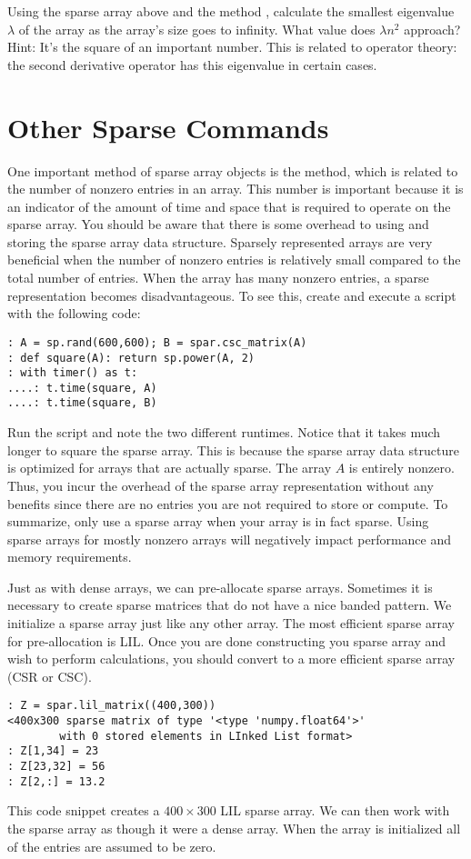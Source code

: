\begin{problem}
Using the sparse array above and the method , calculate the smallest eigenvalue $\lambda$ of the array as the array's size goes to infinity. What value does $\lambda n^2$ approach?  Hint: It's the square of an important number. This is related to operator theory: the second derivative operator has this eigenvalue in certain cases.
\end{problem}

\section*{Other Sparse Commands}

One important method of sparse array objects is the  method, which is related to the number of nonzero entries in an array.  This number is important because it is an indicator of the amount of time and space that is required to operate on the sparse array. You should be aware that there is some overhead to using and storing the sparse array data structure. Sparsely represented arrays are very beneficial when the number of nonzero entries is relatively small compared to the total number of entries. When the array has many nonzero entries, a sparse representation becomes disadvantageous. To see this, create and execute a script with the following code:
\begin{lstlisting}[style=python]
: A = sp.rand(600,600); B = spar.csc_matrix(A)
: def square(A): return sp.power(A, 2)
: with timer() as t:
....: t.time(square, A)
....: t.time(square, B)
\end{lstlisting}

Run the script and note the two different runtimes. Notice that it takes much longer to square the sparse array. This is because the sparse array data structure is optimized for arrays that are actually sparse. The array $A$ is entirely nonzero. Thus, you incur the overhead of the sparse array representation without any benefits since there are no entries you are not required to store or compute. To summarize, only use a sparse array when your array is in fact sparse. Using sparse arrays for mostly nonzero arrays will negatively impact performance and memory requirements.


Just as with dense arrays, we can pre-allocate sparse arrays. Sometimes it is necessary to create sparse matrices that do not have a nice banded pattern.  We initialize a sparse array just like any other array.  The most efficient sparse array for pre-allocation is LIL.  Once you are done constructing you sparse array and wish to perform calculations, you should convert to a more efficient sparse array (CSR or CSC).
\begin{lstlisting}[style=python]
: Z = spar.lil_matrix((400,300))
<400x300 sparse matrix of type '<type 'numpy.float64'>'
        with 0 stored elements in LInked List format>
: Z[1,34] = 23
: Z[23,32] = 56
: Z[2,:] = 13.2
\end{lstlisting}

This code snippet creates a $400 \times 300$ LIL sparse array.  We can then work with the sparse array as though it were a dense array.  When the array is initialized all of the entries
are assumed to be zero.